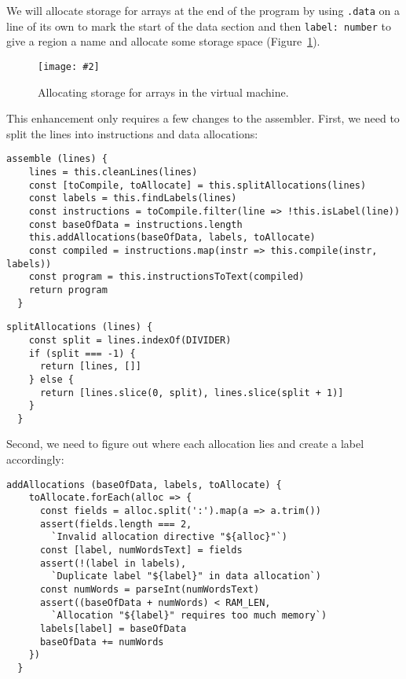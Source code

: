 \documentclass[krantzl]{krantz}
\newcommand{\figpdf}[4]{\begin{figure}%
\centering%
\texttt{[image: \#2]}%
\caption{#3}%
\label{#1}%
\end{figure}}
\newcommand{\figref}[1]{Figure~\ref{#1}}
\begin{document}
We will allocate storage for arrays at the end of the program
by using \texttt{.data} on a line of its own to mark the start of the data section
and then \texttt{label: number} to give a region a name and allocate some storage space
(\figref{virtual-machine-storage-allocation}).

\figpdf{virtual-machine-storage-allocation}{./virtual-machine/storage-allocation.pdf}{Allocating storage for arrays in the virtual machine.}{0.6}


This enhancement only requires a few changes to the assembler.
First,
we need to split the lines into instructions and data allocations:


\begin{lstlisting}[frame=single,frameround=tttt]
  assemble (lines) {
    lines = this.cleanLines(lines)
    const [toCompile, toAllocate] = this.splitAllocations(lines)
    const labels = this.findLabels(lines)
    const instructions = toCompile.filter(line => !this.isLabel(line))
    const baseOfData = instructions.length
    this.addAllocations(baseOfData, labels, toAllocate)
    const compiled = instructions.map(instr => this.compile(instr, labels))
    const program = this.instructionsToText(compiled)
    return program
  }
\end{lstlisting}



\begin{lstlisting}[frame=single,frameround=tttt]
  splitAllocations (lines) {
    const split = lines.indexOf(DIVIDER)
    if (split === -1) {
      return [lines, []]
    } else {
      return [lines.slice(0, split), lines.slice(split + 1)]
    }
  }
\end{lstlisting}



Second,
we need to figure out where each allocation lies and create a label accordingly:


\begin{lstlisting}[frame=single,frameround=tttt]
  addAllocations (baseOfData, labels, toAllocate) {
    toAllocate.forEach(alloc => {
      const fields = alloc.split(':').map(a => a.trim())
      assert(fields.length === 2,
        `Invalid allocation directive "${alloc}"`)
      const [label, numWordsText] = fields
      assert(!(label in labels),
        `Duplicate label "${label}" in data allocation`)
      const numWords = parseInt(numWordsText)
      assert((baseOfData + numWords) < RAM_LEN,
        `Allocation "${label}" requires too much memory`)
      labels[label] = baseOfData
      baseOfData += numWords
    })
  }
\end{lstlisting}
\end{document}
